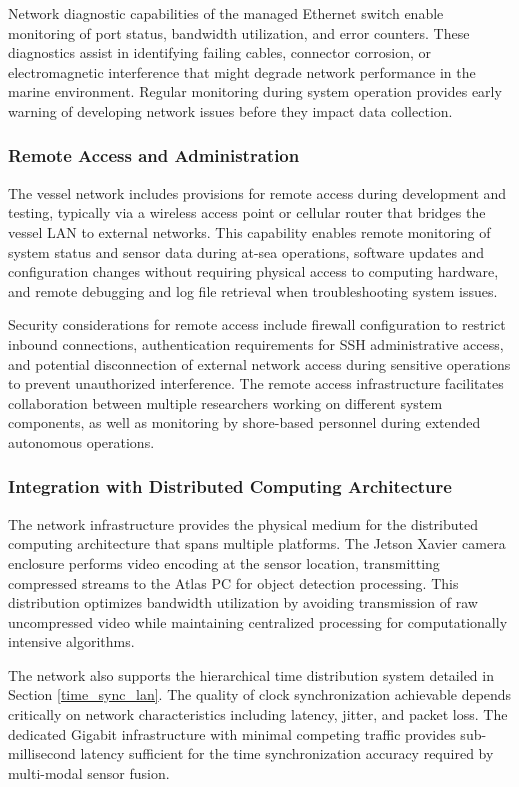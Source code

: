 \documentclass{erauthesis}
\begin{document}
Network diagnostic capabilities of the managed Ethernet switch enable monitoring of port status, bandwidth utilization, and error counters. These diagnostics assist in identifying failing cables, connector corrosion, or electromagnetic interference that might degrade network performance in the marine environment. Regular monitoring during system operation provides early warning of developing network issues before they impact data collection.

\subsubsection{Remote Access and Administration}

The vessel network includes provisions for remote access during development and testing, typically via a wireless access point or cellular router that bridges the vessel LAN to external networks. This capability enables remote monitoring of system status and sensor data during at-sea operations, software updates and configuration changes without requiring physical access to computing hardware, and remote debugging and log file retrieval when troubleshooting system issues.

Security considerations for remote access include firewall configuration to restrict inbound connections, authentication requirements for SSH administrative access, and potential disconnection of external network access during sensitive operations to prevent unauthorized interference. The remote access infrastructure facilitates collaboration between multiple researchers working on different system components, as well as monitoring by shore-based personnel during extended autonomous operations.

\subsubsection{Integration with Distributed Computing Architecture}

The network infrastructure provides the physical medium for the distributed computing architecture that spans multiple platforms. The Jetson Xavier camera enclosure performs video encoding at the sensor location, transmitting compressed streams to the Atlas PC for object detection processing. This distribution optimizes bandwidth utilization by avoiding transmission of raw uncompressed video while maintaining centralized processing for computationally intensive algorithms.

The network also supports the hierarchical time distribution system detailed in Section \ref{time_sync_lan}. The quality of clock synchronization achievable depends critically on network characteristics including latency, jitter, and packet loss. The dedicated Gigabit infrastructure with minimal competing traffic provides sub-millisecond latency sufficient for the time synchronization accuracy required by multi-modal sensor fusion.
\end{document}
